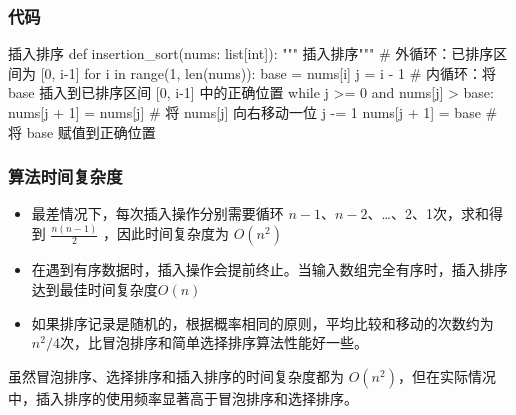 \begin{frame}
\begin{center}
    \end{center}
\end{frame}


\begin{frame}[fragile]
    \frametitle{代码}
    \begin{codeblock}{插入排序}
def insertion_sort(nums: list[int]):
    """ 插入排序"""
    # 外循环：已排序区间为 [0, i-1]
    for i in range(1, len(nums)):
        base = nums[i]
        j = i - 1
        # 内循环：将 base 插入到已排序区间 [0, i-1] 中的正确位置
        while j >= 0 and nums[j] > base:
            nums[j + 1] = nums[j] # 将 nums[j] 向右移动一位
            j -= 1
        nums[j + 1] = base # 将 base 赋值到正确位置
    \end{codeblock}
\end{frame}


\begin{frame}
    \frametitle{算法时间复杂度}
    \begin{itemize}
        \item 最差情况下，每次插入操作分别需要循环 $n-1$、$n-2$、…、2、1次，求和得到 $\frac{n(n-1)}{2}$ ，因此时间复杂度为 $O(n^2)$
        \item 在遇到有序数据时，插入操作会提前终止。当输入数组完全有序时，插入排序达到最佳时间复杂度$O(n)$
        \item 如果排序记录是随机的，根据概率相同的原则，平均比较和移动的次数约为$n^2/4$次，比冒泡排序和简单选择排序算法性能好一些。
      \end{itemize}
      \begin{blankblock}{}
        虽然冒泡排序、选择排序和插入排序的时间复杂度都为 $O(n^2)$，但在实际情况中，插入排序的使用频率显著高于冒泡排序和选择排序。
      \end{blankblock}
\end{frame}



